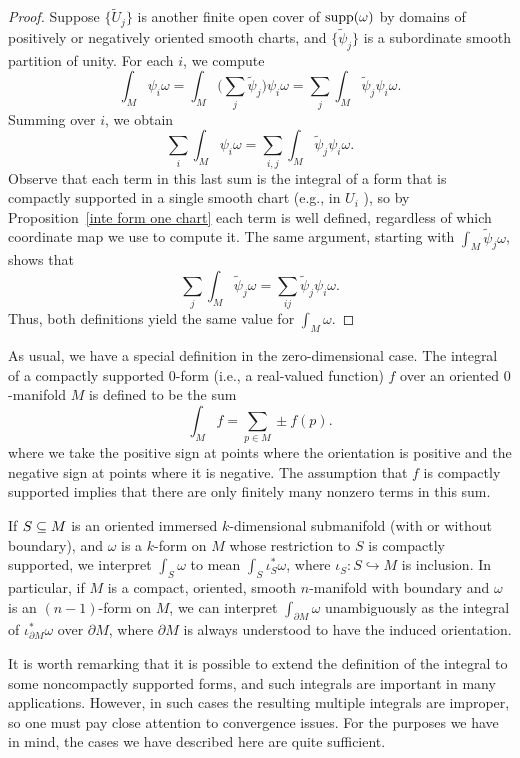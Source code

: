 \begin{proof}
Suppose $\{\widetilde{U}_j\}$ is another finite open cover of $\mathrm{supp}(\omega)$ by domains of positively or negatively oriented smooth charts, and $\{\widetilde{\psi}_j\}$ is a subordinate smooth partition of unity. For each $i$, we compute
\[\int_M\psi_i\omega=\int_M\Big(\sum_j\widetilde{\psi}_j\Big)\psi_i\omega=\sum_j\int_M\widetilde{\psi}_j\psi_i\omega.\]
Summing over $i$, we obtain
\[\sum_i\int_M\psi_i\omega=\sum_{i,j}\int_M\widetilde{\psi}_j\psi_i\omega.\]
Observe that each term in this last sum is the integral of a form that is compactly supported in a single smooth chart (e.g., in $U_i$ ), so by Proposition~\ref{inte form one chart} each term is well defined, regardless of which coordinate map we use to compute it. The same argument, starting with $\int_M\widetilde{\psi}_j\omega$, shows that
\[\sum_j\int_M\widetilde{\psi}_j\omega=\sum_{ij}\widetilde{\psi}_j\psi_i\omega.\]
Thus, both definitions yield the same value for $\int_M\omega$.
\end{proof}
As usual, we have a special definition in the zero-dimensional case. The integral of a compactly supported $0$-form (i.e., a real-valued function) $f$ over an oriented
$0$-manifold $M$ is defined to be the sum
\[\int_Mf=\sum_{p\in M}\pm f(p).\]
where we take the positive sign at points where the orientation is positive and the
negative sign at points where it is negative. The assumption that $f$ is compactly
supported implies that there are only finitely many nonzero terms in this sum.\par
If $S\subseteq M$ is an oriented immersed $k$-dimensional submanifold (with or without
boundary), and $\omega$ is a $k$-form on $M$ whose restriction to $S$ is compactly supported, we interpret $\int_S\omega$ to mean $\int_S\iota_S^*\omega$, where $\iota_S:S\hookrightarrow M$ is inclusion. In particular, if $M$ is a compact, oriented, smooth $n$-manifold with boundary and $\omega$ is an $(n-1)$-form on $M$, we can interpret $\int_{\partial M}\omega$ unambiguously as the integral of $\iota_{\partial M}^*\omega$ over $\partial M$, where $\partial M$ is always understood to have the induced orientation.
\begin{remark}
It is worth remarking that it is possible to extend the definition of the integral to some noncompactly supported forms, and such integrals are important in many
applications. However, in such cases the resulting multiple integrals are improper, so one must pay close attention to convergence issues. For the purposes we have in
mind, the cases we have described here are quite sufficient.
\end{remark}
